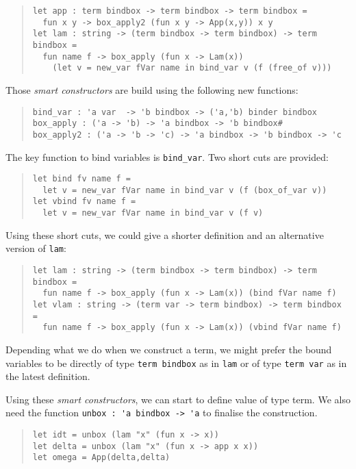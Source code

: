 \documentclass[11pt]{article}
\begin{document}
\begin{quote}
\begin{verbatim}
let app : term bindbox -> term bindbox -> term bindbox =
  fun x y -> box_apply2 (fun x y -> App(x,y)) x y
let lam : string -> (term bindbox -> term bindbox) -> term bindbox =
  fun name f -> box_apply (fun x -> Lam(x))
    (let v = new_var fVar name in bind_var v (f (free_of v)))
\end{verbatim}
\end{quote}

Those \emph{smart constructors} are build using the following new functions:
\begin{quote}
\begin{verbatim}
bind_var : 'a var  -> 'b bindbox -> ('a,'b) binder bindbox
box_apply : ('a -> 'b) -> 'a bindbox -> 'b bindbox#
box_apply2 : ('a -> 'b -> 'c) -> 'a bindbox -> 'b bindbox -> 'c
\end{verbatim}
\end{quote}

The key function to bind variables is \verb#bind_var#. Two short cuts
are provided:
\begin{quote}
\begin{verbatim}
let bind fv name f =
  let v = new_var fVar name in bind_var v (f (box_of_var v))
let vbind fv name f =
  let v = new_var fVar name in bind_var v (f v)
\end{verbatim}
\end{quote}

Using these short cuts, we could give a shorter definition and an
alternative version of \verb#lam#:

\begin{quote}
\begin{verbatim}
let lam : string -> (term bindbox -> term bindbox) -> term bindbox =
  fun name f -> box_apply (fun x -> Lam(x)) (bind fVar name f)
let vlam : string -> (term var -> term bindbox) -> term bindbox =
  fun name f -> box_apply (fun x -> Lam(x)) (vbind fVar name f)
\end{verbatim}
\end{quote}

Depending what we do when we construct a term, we might prefer
the bound variables to be directly of type \verb#term bindbox# as in
\verb#lam# or of type \verb#term var# as in the latest definition.

Using these \emph{smart constructors}, we can start to define value of
type term. We also need the function \verb#unbox : 'a bindbox -> 'a#
to finalise the construction.
\begin{quote}
\begin{verbatim}
let idt = unbox (lam "x" (fun x -> x))
let delta = unbox (lam "x" (fun x -> app x x))
let omega = App(delta,delta)
\end{verbatim}
\end{quote}
\end{document}
